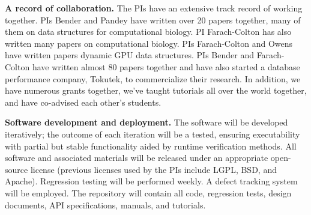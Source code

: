 \noindent
{\bf A record of collaboration.}
The PIs have an extensive track record of working together.  PIs Bender and Pandey have written over 20 papers together, many of them on data structures for computational biology.  PI Farach-Colton has also written many papers on computational biology.  PIs Farach-Colton and Owens have written papers dynamic GPU data structures.  PIs Bender and Farach-Colton have written almost 80 papers together and have also started a database performance company, Tokutek, to commercialize their research.  In addition, we have numerous grants together, we've taught tutorials all over the world together, and have co-advised each other's students. 

\noindent
{\bf Software development and deployment.} The software will be developed iteratively; the outcome of each iteration will be a tested, ensuring executability with partial but stable functionality aided by runtime verification methods. All software and associated materials will be released under an appropriate open-source license (previous licenses used by the PIs include LGPL, BSD, and Apache). Regression testing will be performed weekly. A defect tracking system will be employed. The repository will contain all code, regression tests, design documents, API specifications, manuals, and tutorials.
